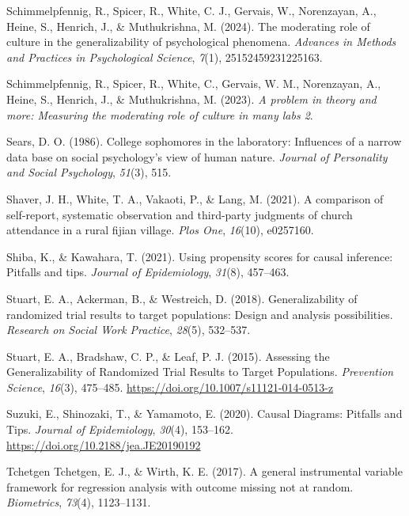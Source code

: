 \documentclass[
  single column]{article}
\newlength{\cslhangindent}
\newenvironment{CSLReferences}[2] %
 {\begin{list}{}{%
  \setlength{\itemindent}{0pt}
  \setlength{\leftmargin}{0pt}
  \setlength{\parsep}{0pt}
  \ifodd #1
   \setlength{\leftmargin}{\cslhangindent}
   \setlength{\itemindent}{-1\cslhangindent}
  \fi
  \setlength{\itemsep}{#2\baselineskip}}}
 {\end{list}}
\begin{document}
\begin{CSLReferences}{1}{0}
Schimmelpfennig, R., Spicer, R., White, C. J., Gervais, W., Norenzayan,
A., Heine, S., Henrich, J., \& Muthukrishna, M. (2024). The moderating
role of culture in the generalizability of psychological phenomena.
\emph{Advances in Methods and Practices in Psychological Science},
\emph{7}(1), 25152459231225163.

Schimmelpfennig, R., Spicer, R., White, C., Gervais, W. M., Norenzayan,
A., Heine, S., Henrich, J., \& Muthukrishna, M. (2023). \emph{A problem
in theory and more: Measuring the moderating role of culture in many
labs 2}.

Sears, D. O. (1986). College sophomores in the laboratory: Influences of
a narrow data base on social psychology's view of human nature.
\emph{Journal of Personality and Social Psychology}, \emph{51}(3), 515.

Shaver, J. H., White, T. A., Vakaoti, P., \& Lang, M. (2021). A
comparison of self-report, systematic observation and third-party
judgments of church attendance in a rural fijian village. \emph{Plos
One}, \emph{16}(10), e0257160.

Shiba, K., \& Kawahara, T. (2021). Using propensity scores for causal
inference: Pitfalls and tips. \emph{Journal of Epidemiology},
\emph{31}(8), 457--463.

Stuart, E. A., Ackerman, B., \& Westreich, D. (2018). Generalizability
of randomized trial results to target populations: Design and analysis
possibilities. \emph{Research on Social Work Practice}, \emph{28}(5),
532--537.

Stuart, E. A., Bradshaw, C. P., \& Leaf, P. J. (2015). Assessing the
Generalizability of Randomized Trial Results to Target Populations.
\emph{Prevention Science}, \emph{16}(3), 475--485.
\url{https://doi.org/10.1007/s11121-014-0513-z}

Suzuki, E., Shinozaki, T., \& Yamamoto, E. (2020). Causal Diagrams:
Pitfalls and Tips. \emph{Journal of Epidemiology}, \emph{30}(4),
153--162. \url{https://doi.org/10.2188/jea.JE20190192}

Tchetgen Tchetgen, E. J., \& Wirth, K. E. (2017). A general instrumental
variable framework for regression analysis with outcome missing not at
random. \emph{Biometrics}, \emph{73}(4), 1123--1131.


\end{CSLReferences}
\end{document}
